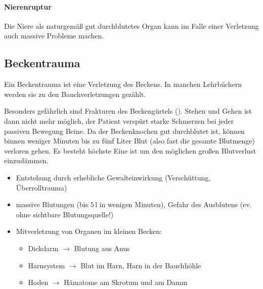 \paragraph{Nierenruptur}\label{topic:nierenruptur}
Die Niere als naturgemäß gut durchblutetes Organ kann im
Falle einer Verletzung auch massive Probleme machen.


\subsection{Beckentrauma}
\label{topic:beckentrauma}

Ein Beckentrauma ist eine Verletzung des Beckens. In manchen Lehrbüchern werden
sie zu den Bauchverletzungen gezählt. 

Besonders gefährlich sind Frakturen des Beckengürtels
(). Stehen und Gehen ist dann nicht mehr möglich,
der Patient verspürt starke Schmerzen bei jeder passiven Bewegung 
Beine. Da der Beckenknochen gut durchblutet ist, können binnen weniger Minuten
bis zu fünf Liter Blut (also fast die gesamte Blutmenge) verloren gehen. Es besteht höchste
 Eine  ist 
um den möglichen großen Blutverlust einzudämmen.

\begin{itemize}
  \item Entstehung durch erhebliche Gewalteinwirkung  (Verschüttung, Überrolltrauma)
  \item massive  Blutungen (bis 5\,l in wenigen  Minuten),
  Gefahr des Ausblutens (ev. ohne sichtbare  Blutungsquelle!)
  \item Mitverletzung von Organen im kleinen  Becken:
  \begin{itemize}
    \item Dickdarm ${\rightarrow}$ Blutung aus Anus
    \item Harnsystem ${\rightarrow}$ Blut im Harn, Harn in der
    Bauchhöhle
    \item Hoden ${\rightarrow}$ Hämatome am Skrotum und am  Damm
  \end{itemize}
\end{itemize}


